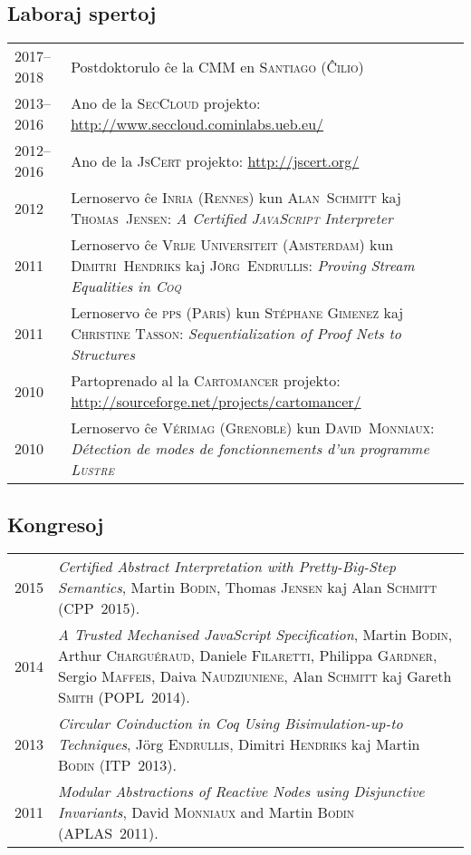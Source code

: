 \documentclass[12pt,a4paper]{article}
\makeatletter
\newcommand{\en}[1]{\foreignlanguage{english}{\textit{#1}}}
\newenvironment{datecvsection}[1]%
               {\subsection*{#1}%
                 \noindent \begin{tabular}{@{}p{\annee}p{\texte}@{}}}
               {\end{tabular}}
\makeatother
\begin{document}
\begin{datecvsection}{Laboraj spertoj}

    2017–2018 & Postdoktorulo ĉe la \textsc{CMM} en \textsc{Santiago} (\textsc{Ĉilio}) \\

	2013–2016 & Ano de la \textsc{SecCloud} projekto:  \url{http://www.seccloud.cominlabs.ueb.eu/} \\

	2012–2016 & Ano de la \textsc{JsCert} projekto:  \url{http://jscert.org/} \\

	2012 & Lernoservo ĉe \textsc{Inria} (\textsc{Rennes}) kun \textsc{Alan~Schmitt} kaj \textsc{Thomas~Jensen}:
	\en{\textit{A Certified \textsc{JavaScript} Interpreter}} \\

	2011 & Lernoservo ĉe \textsc{Vrĳe Universiteit} (\textsc{Amsterdam}) kun \textsc{Dimitri~Hendriks} kaj \textsc{Jörg~Endrullis}:
	\en{\textit{Proving Stream Equalities in \textsc{Coq}}} \\

	2011 & Lernoservo ĉe \textsc{pps} (\textsc{Paris}) kun \textsc{Stéphane Gimenez} kaj \textsc{Christine Tasson}:
	\en{\textit{Sequentialization of Proof Nets to Structures}} \\

	2010 & Partoprenado al la \textsc{Cartomancer} projekto:  \url{http://sourceforge.net/projects/cartomancer/} \\

	2010 & Lernoservo ĉe \textsc{Vérimag} (\textsc{Grenoble}) kun \textsc{David~Monniaux}:
	\textit{Détection de modes de fonctionnements d’un programme \textsc{Lustre}} \\

\end{datecvsection}

\begin{datecvsection}{Kongresoj}

  2015 & \textit{Certified Abstract Interpretation with Pretty-Big-Step Semantics}, Martin \textsc{Bodin}, Thomas \textsc{Jensen} kaj Alan \textsc{Schmitt} (CPP~2015). \\

  2014 & \textit{A Trusted Mechanised JavaScript Specification}, Martin \textsc{Bodin}, Arthur \textsc{Charguéraud}, Daniele \textsc{Filaretti}, Philippa \textsc{Gardner}, Sergio \textsc{Maffeis}, Daiva \textsc{Naudziuniene}, Alan \textsc{Schmitt} kaj Gareth \textsc{Smith} (POPL~2014). \\

  2013 & \textit{Circular Coinduction in Coq Using Bisimulation-up-to Techniques}, Jörg \textsc{Endrullis}, Dimitri \textsc{Hendriks} kaj Martin \textsc{Bodin} (ITP~2013). \\

  2011 & \textit{Modular Abstractions of Reactive Nodes using Disjunctive Invariants}, David \textsc{Monniaux} and Martin \textsc{Bodin} (APLAS~2011). \\

\end{datecvsection}
\end{document}
